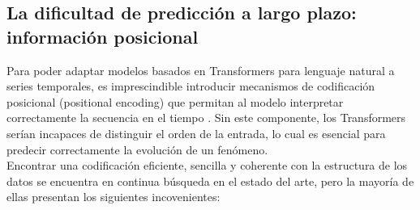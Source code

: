 \subsection{La dificultad de predicción a largo plazo: información posicional}

Para poder adaptar modelos basados en Transformers para lenguaje natural a series temporales,  es imprescindible introducir mecanismos de codificación posicional (positional encoding) que permitan al modelo interpretar correctamente la secuencia en el tiempo \cite{irani2025positionalencodingtransformerbasedtime}. Sin este componente, los Transformers serían incapaces de distinguir el orden de la entrada, lo cual es esencial para predecir correctamente la evolución de un fenómeno.\\

Encontrar una codificación eficiente, sencilla y coherente con la estructura de los datos se encuentra en continua búsqueda en el estado del arte, pero la mayoría de ellas presentan los siguientes incovenientes:

